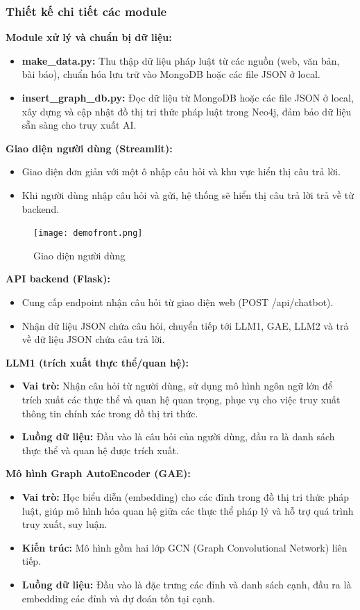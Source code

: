 \documentclass[a4paper]{article}
\begin{document}
\subsubsection{Thiết kế chi tiết các module}
\textbf{Module xử lý và chuẩn bị dữ liệu:} 
\begin{itemize}
    \item \textbf{make\_data.py:} Thu thập dữ liệu pháp luật từ các nguồn (web, văn bản, bài báo), chuẩn hóa lưu trữ vào MongoDB hoặc các file JSON ở local.
    \item \textbf{insert\_graph\_db.py:} Đọc dữ liệu từ MongoDB hoặc các file JSON ở local, xây dựng và cập nhật đồ thị tri thức pháp luật trong Neo4j, đảm bảo dữ liệu sẵn sàng cho truy xuất AI.
\end{itemize}
\textbf{Giao diện người dùng (Streamlit):}
\begin{itemize}
    \item Giao diện đơn giản với một ô nhập câu hỏi và khu vực hiển thị câu trả lời.
    \item Khi người dùng nhập câu hỏi và gửi, hệ thống sẽ hiển thị câu trả lời trả về từ backend.
    
\end{itemize}
\begin{figure}[H]
    \centering
    \texttt{[image: demofront.png]}
    \caption{Giao diện người dùng}

\end{figure}
\textbf{API backend (Flask):}
\begin{itemize}
    \item Cung cấp endpoint nhận câu hỏi từ giao diện web (POST /api/chatbot).
    \item Nhận dữ liệu JSON chứa câu hỏi, chuyển tiếp tới LLM1, GAE, LLM2 và trả về dữ liệu JSON chứa câu trả lời.
\end{itemize}
\textbf{LLM1 (trích xuất thực thể/quan hệ):}
\begin{itemize}
    \item \textbf{Vai trò:} Nhận câu hỏi từ người dùng, sử dụng mô hình ngôn ngữ lớn để trích xuất các thực thể và quan hệ quan trọng, phục vụ cho việc truy xuất thông tin chính xác trong đồ thị tri thức.
    \item \textbf{Luồng dữ liệu:} Đầu vào là câu hỏi của người dùng, đầu ra là danh sách thực thể và quan hệ được trích xuất.
\end{itemize}
\textbf{Mô hình Graph AutoEncoder (GAE):}
\begin{itemize}
    \item \textbf{Vai trò:} Học biểu diễn (embedding) cho các đỉnh trong đồ thị tri thức pháp luật, giúp mô hình hóa quan hệ giữa các thực thể pháp lý và hỗ trợ quá trình truy xuất, suy luận.
    \item \textbf{Kiến trúc:} Mô hình gồm hai lớp GCN (Graph Convolutional Network) liên tiếp.
    \item \textbf{Luồng dữ liệu:} Đầu vào là đặc trưng các đỉnh và danh sách cạnh, đầu ra là embedding các đỉnh và dự đoán tồn tại cạnh.
\end{itemize}
\end{document}
